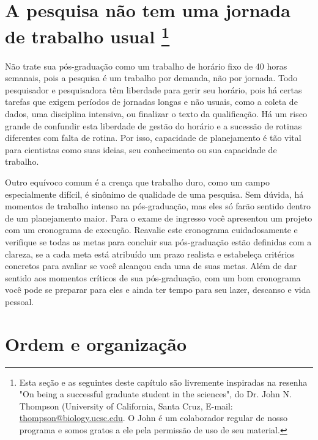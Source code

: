 \section[A pesquisa não tem uma jornada de trabalho usual]{A pesquisa não tem uma jornada de trabalho usual \footnote{Esta seção e as seguintes deste capítulo são livremente inspiradas na resenha "On being a successful graduate student in the sciences", do Dr. John N. Thompson (University of California, Santa Cruz, E-mail: \url{thompson@biology.ucsc.edu}. O John é um colaborador regular de nosso programa e somos gratos a ele pela permissão de uso de seu material.}}

Não trate sua pós-graduação como um trabalho de horário fixo de 40
horas semanais, pois a pesquisa é um trabalho por demanda, não por
jornada. Todo pesquisador e pesquisadora têm liberdade para gerir seu
horário, pois há certas tarefas que exigem períodos de jornadas longas e
não usuais, como a coleta de dados, uma disciplina intensiva, ou
finalizar o texto da qualificação. Há um risco grande de confundir
esta liberdade de gestão do horário e a sucessão de rotinas diferentes
com falta de rotina. Por isso, capacidade de planejamento é tão vital
para cientistas como suas ideias, seu conhecimento ou sua
capacidade de trabalho.

Outro equívoco comum é a crença que trabalho duro, como um campo
especialmente difícil, é sinônimo de qualidade de uma pesquisa. Sem
dúvida, há momentos de trabalho intenso na pós-graduação, mas eles só
farão sentido dentro de um planejamento maior. Para o exame de
ingresso você apresentou um projeto com um cronograma de
execução. Reavalie este cronograma cuidadosamente e verifique se todas
as metas para concluir sua pós-graduação estão definidas com a
clareza, se a cada meta está atribuído um prazo realista e estabeleça
critérios concretos para avaliar se você alcançou cada uma de suas
metas. Além de dar sentido aos momentos críticos de sua pós-graduação,
com um bom cronograma você pode se preparar para eles e ainda ter
tempo para seu lazer, descanso e vida pessoal.

\section{Ordem e organização}

